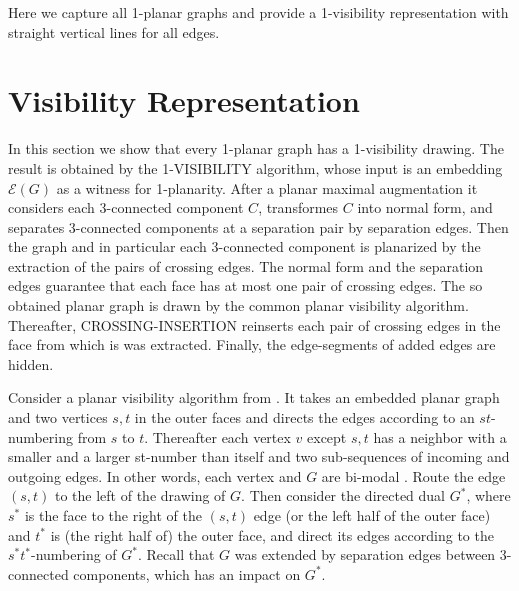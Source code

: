 \documentclass[runningheads]{llncs}
\begin{document}
Here we capture all 1-planar graphs  and provide a 1-visibility
representation with straight vertical lines for all  edges.



\section{Visibility Representation}

In this section we show that every 1-planar graph has a 1-visibility
drawing. The result is obtained by the 1-VISIBILITY algorithm, whose
input is an embedding $\mathcal{E}(G)$ as a witness for 1-planarity.
After a planar maximal augmentation it considers each 3-connected
component $C$, transformes $C$ into normal form, and separates
3-connected components at a separation pair by separation edges.
Then the graph and in particular each 3-connected component is
planarized by the extraction of the pairs of crossing edges. The
normal form and the separation edges guarantee that each face has at
most one pair of crossing edges. The so obtained planar graph is
drawn by the common planar visibility algorithm. Thereafter,
CROSSING-INSERTION  reinserts each pair of crossing edges in the
face from which is was extracted. Finally, the edge-segments of
added edges are hidden.


\iffalse
 Each separating pair $\{u, v\}$ sandwiches the visibility
representations of the 3-connected components $C_0, \ldots, C_{k-1}$
attached to  $\{u, v\}$ between the vertex-segments of $u$ and $v$,
and the components are placed left to right and are separated by the
separation edges. The sandwich comes from the st-numbering and the
left-to-right ordering from the $s^*t^*$-numbering of the dual
graph.

\fi


Consider a  planar visibility algorithm  from
\cite{dett-gdavg-99,rt-rplbopg-86, TT-vrpg-86}.  It  takes an
embedded planar graph and two vertices $s,t$ in the outer faces and
directs the edges according to an $st$-numbering from $s$ to $t$.
Thereafter each vertex $v$ except $s,t$ has a neighbor with a
smaller and a larger st-number than itself and two sub-sequences of
incoming and outgoing edges. In other words, each vertex and $G$ are
bi-modal \cite{rt-rplbopg-86}. Route the edge $(s,t)$ to the left of
the drawing of $G$. Then consider the directed dual $G^*$, where
$s^*$ is the face to the right of the $(s,t)$ edge (or the left half
of the outer face) and $t^*$ is (the right half of) the outer face,
and direct its edges according to the $s^*t^*$-numbering of $G^*$.
Recall that $G$ was extended by separation edges between
$3$-connected components, which has an impact on $G^*$.
\end{document}
